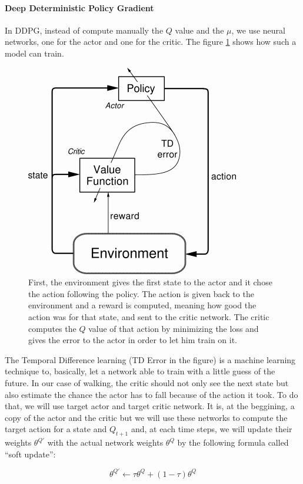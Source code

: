 \documentclass{article}
\begin{document}
\paragraph{Deep Deterministic Policy Gradient}

In DDPG, instead of compute manually the $Q$ value and the $\mu$, we
use neural networks, one for the actor and one for the critic. The figure
\ref{fig:actor-critic} shows how such a model can train.

\begin{figure}[ht]
  \centering
  \includegraphics[width=.5\textwidth]{actor-critic}
  \caption{First, the environment gives the first state to the actor and it chose the
action following the policy. The action is given back to the environment and a
reward is computed, meaning how good the action was for that state, and sent to
the critic network. The critic computes the $Q$ value of that action by
minimizing the loss and gives the error to the actor in order to let him train
on it.}
  \label{fig:actor-critic}
\end{figure}

The Temporal Difference learning (TD Error in the figure) is a machine learning
technique to, basically, let a network able to train with a little guess of the
future. In our case of walking, the critic should not only see the next state
but also estimate the chance the actor has to fall because of the action it
took. To do that, we will use target actor and target critic network. It is, at
the beggining, a copy of the actor and the critic but we will use these networks
to compute the target action for a state and $Q_{t+1}$ and, at each time steps,
we will update their weights $\theta^{Q'}$ with the actual network weights
$\theta^Q$ by the following formula called ``soft update'':  

\begin{equation}
\theta^{Q'} \leftarrow \tau\theta^Q + (1 - \tau)\theta^Q
\end{equation}
\end{document}
